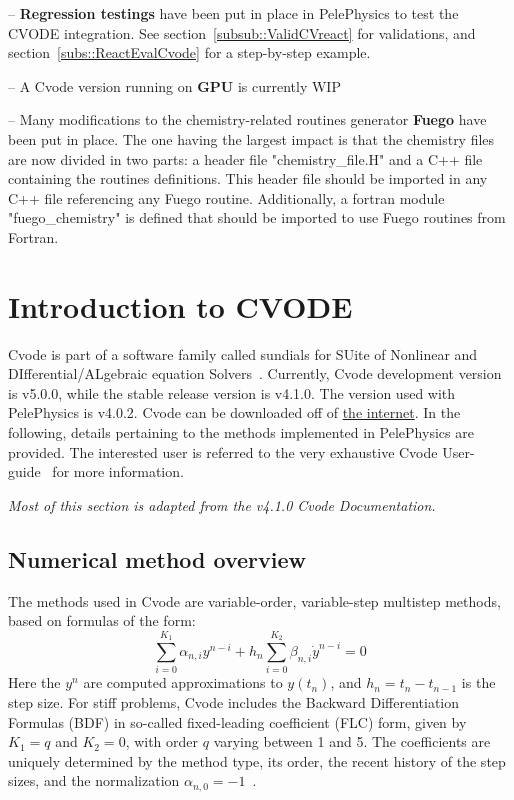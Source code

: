 \documentclass[12pt]{article}
\begin{document}
-- \textbf{Regression testings} have been put in place in PelePhysics to test the CVODE integration. See section~\ref{subsub::ValidCVreact} for validations, and section~\ref{subs::ReactEvalCvode} for a step-by-step example.

-- A Cvode version running on \textbf{GPU} is currently WIP

-- Many modifications to the chemistry-related routines generator \textbf{Fuego} have been put in place. The one having the largest impact is that the chemistry files are now divided in two parts: a header file "chemistry_file.H" and a C++ file containing the routines definitions. This header file should be imported in any C++ file referencing any Fuego routine. Additionally, a fortran module "fuego_chemistry" is defined that should be imported to use Fuego routines from Fortran.

\section{Introduction to CVODE}
Cvode is part of a software family called sundials for SUite of Nonlinear and DIfferential/ALgebraic equation Solvers~\cite{hindmarsh2005sundials}. Currently, Cvode development version is v5.0.0, while the stable release version is v4.1.0. The version used with PelePhysics is v4.0.2. Cvode can be downloaded off of \href{https://computation.llnl.gov/projects/sundials/sundials-software}{the internet}. In the following, details pertaining to the methods implemented in PelePhysics are provided. The interested user is referred to the very exhaustive Cvode User-guide~\cite{CVODE:2019} for more information.

\textit{Most of this section is adapted from the v4.1.0 Cvode Documentation.}

\subsection{Numerical method overview}

The methods used in Cvode are variable-order, variable-step multistep methods, based on formulas of the form:
\begin{equation}
\sum_{i=0}^{K_1} \alpha_{n,i} y^{n-i} + h_n \sum_{i=0}^{K_2} \beta_{n,i} \dot{y}^{n-i} = 0 
\end{equation}
Here the $y^n$ are computed approximations to $y(t_n)$, and $h_n = t_n-t_{n-1}$ is the step size. For stiff problems, Cvode includes the Backward Differentiation Formulas (BDF) in so-called fixed-leading coefficient (FLC) form, given by $K_1=q$ and $K_2= 0$, with order $q$ varying between 1 and 5.  The coefficients are uniquely determined by the method type, its order, the recent history of the step sizes, and the normalization $\alpha_{n,0}=-1$~\cite{byrne1975polyalgorithm,jackson1980alternative}.  
\end{document}

